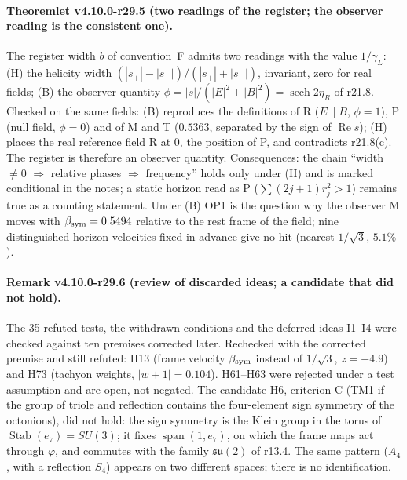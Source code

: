 \paragraph{Theoremlet v4.10.0-r29.5 (two readings of the register; the observer reading is the consistent one).}
The register width \(b\) of convention~F admits two readings with the value \(1/\gamma_L\): (H) the helicity width
\((|s_+|-|s_-|)/(|s_+|+|s_-|)\), invariant, zero for real fields; (B) the observer quantity \(\phi=|s|/(|E|^2+|B|^2)=\operatorname{sech}2\eta_R\) of
r21.8.  Checked on the same fields: (B) reproduces the definitions of R (\(E\parallel B\), \(\phi=1\)), P (null field, \(\phi=0\)) and of M and T
(\(0.5363\), separated by the sign of \(\operatorname{Re}s\)); (H) places the real reference field R at \(0\), the position of P, and contradicts
r21.8(c).  The register is therefore an observer quantity.  Consequences: the chain ``width \(\ne0\) \(\Rightarrow\) relative phases \(\Rightarrow\)
frequency'' holds only under (H) and is marked conditional in the notes; a static horizon read as P (\(\sum(2j+1)r_j^2>1\)) remains true as a counting
statement.  Under (B) OP1 is the question why the observer M moves with \(\beta_{\rm sym}=0.5494\) relative to the rest frame of the field; nine
distinguished horizon velocities fixed in advance give no hit (nearest \(1/\sqrt3\), \(5.1\%\)).

\paragraph{Remark v4.10.0-r29.6 (review of discarded ideas; a candidate that did not hold).}
The 35 refuted tests, the withdrawn conditions and the deferred ideas I1--I4 were checked against ten premises corrected later.  Rechecked with the
corrected premise and still refuted: H13 (frame velocity \(\beta_{\rm sym}\) instead of \(1/\sqrt3\), \(z=-4.9\)) and H73 (tachyon weights,
\(|w+1|=0.104\)).  H61--H63 were rejected under a test assumption and are open, not negated.  The candidate H6, criterion C (TM1 if the group of triole
and reflection contains the four-element sign symmetry of the octonions), did not hold: the sign symmetry is the Klein group in the torus of
\(\operatorname{Stab}(e_7)=SU(3)\); it fixes \(\operatorname{span}(1,e_7)\), on which the frame maps act through \(\varphi\), and commutes with the
family \(\mathfrak{su}(2)\) of r13.4.  The same pattern (\(A_4\), with a reflection \(S_4\)) appears on two different spaces; there is no
identification.

